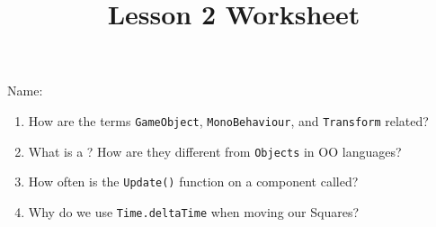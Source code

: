\documentclass[12pt]{../rhitcsse}
\title{Lesson 2 Worksheet}
\begin{document}
\maketitle

\vspace*{0.15in}\hspace{0.25in}Name:\hrulefill\hspace{0.25in}\hspace{0.25in}

\begin{enumerate}
  \item How are the terms \texttt{GameObject}, \texttt{MonoBehaviour}, and \texttt{Transform} related? 
  \vfill

  \item What is a ? How are they different from \texttt{Objects} in OO languages?
  \vfill

  \item How often is the \texttt{Update()} function on a component called?
  \vfill
  
  \item Why do we use \texttt{Time.deltaTime} when moving our Squares?
  \vfill
  
\end{enumerate}
\end{document}
